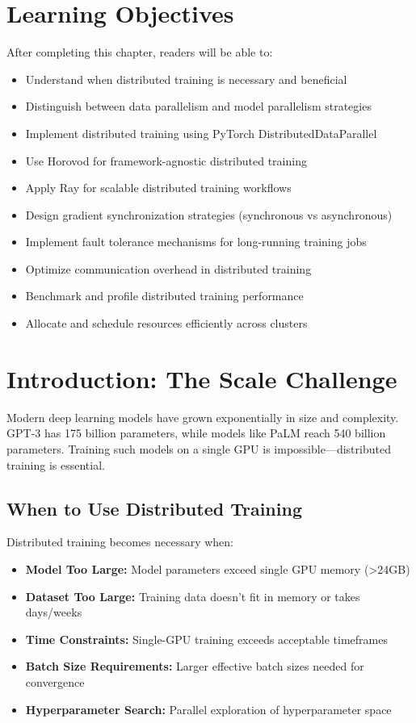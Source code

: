 \section{Learning Objectives}

After completing this chapter, readers will be able to:
\begin{itemize}
    \item Understand when distributed training is necessary and beneficial
    \item Distinguish between data parallelism and model parallelism strategies
    \item Implement distributed training using PyTorch DistributedDataParallel
    \item Use Horovod for framework-agnostic distributed training
    \item Apply Ray for scalable distributed training workflows
    \item Design gradient synchronization strategies (synchronous vs asynchronous)
    \item Implement fault tolerance mechanisms for long-running training jobs
    \item Optimize communication overhead in distributed training
    \item Benchmark and profile distributed training performance
    \item Allocate and schedule resources efficiently across clusters
\end{itemize}

\section{Introduction: The Scale Challenge}

Modern deep learning models have grown exponentially in size and complexity. GPT-3 has 175 billion parameters, while models like PaLM reach 540 billion parameters. Training such models on a single GPU is impossible—distributed training is essential.

\subsection{When to Use Distributed Training}

Distributed training becomes necessary when:

\begin{itemize}
    \item \textbf{Model Too Large:} Model parameters exceed single GPU memory (>24GB)
    \item \textbf{Dataset Too Large:} Training data doesn't fit in memory or takes days/weeks
    \item \textbf{Time Constraints:} Single-GPU training exceeds acceptable timeframes
    \item \textbf{Batch Size Requirements:} Larger effective batch sizes needed for convergence
    \item \textbf{Hyperparameter Search:} Parallel exploration of hyperparameter space
\end{itemize}

